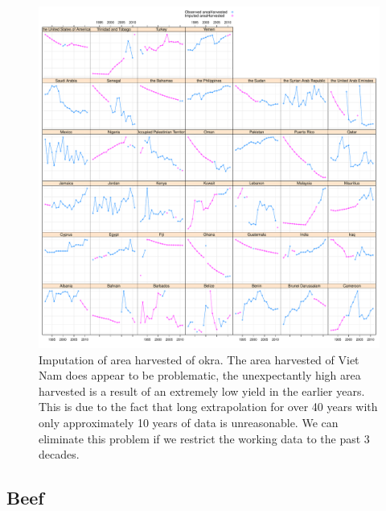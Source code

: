 \documentclass[nojss]{jss}\usepackage[]{graphicx}\usepackage[]{color}
\makeatletter
\def\maxwidth{ %
  \ifdim\Gin@nat@width>\linewidth
    \linewidth
  \else
    \Gin@nat@width
  \fi
}
\newenvironment{knitrout}{}{} %
\makeatother
\begin{document}
\begin{knitrout}
\color{fgcolor}\begin{figure}[!ht]


{\centering \includegraphics[width=\maxwidth]{figure/okra-areaharvested-imputed} 

}

\caption[Imputation of area harvested of okra]{Imputation of area harvested of okra. The area harvested of Viet Nam does appear to be problematic, the unexpectantly high area harvested is a result of an extremely low yield in the earlier years. This is due to the fact that long extrapolation for over 40 years with only approximately 10 years of data is unreasonable. We can eliminate this problem if we restrict the working data to the past 3 decades.\label{fig:okra-areaharvested-imputed}}
\end{figure}


\end{knitrout}


\FloatBarrier
\subsection{Beef}
\end{document}
